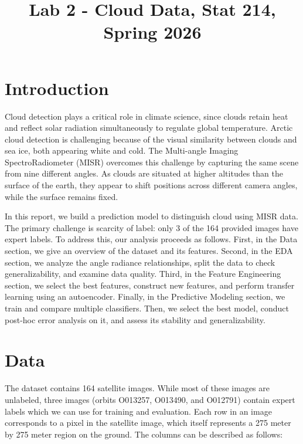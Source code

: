 \documentclass[10pt,letterpaper]{article}
\title{Lab 2 - Cloud Data, Stat 214, Spring 2026\vspace{-2em}}
\begin{document}
\maketitle

\section{Introduction}

Cloud detection plays a critical role in climate science, since clouds retain heat and reflect solar radiation simultaneously to regulate global temperature. Arctic cloud detection is challenging because of the visual similarity between clouds and sea ice, both appearing white and cold. The Multi-angle Imaging SpectroRadiometer (MISR) overcomes this challenge by capturing the same scene from nine different angles. As clouds are situated at higher altitudes than the surface of the earth, they appear to shift positions across different camera angles, while the surface remains fixed. 

In this report, we build a prediction model to distinguish cloud using MISR data. The primary challenge is scarcity of label: only 3 of the 164 provided images have expert labels. To address this, our analysis proceeds as follows. First, in the Data section, we  give an overview of the dataset and its features. Second, in the EDA section, we analyze the angle radiance relationships, split the data to check generalizability, and examine data quality. Third, in the Feature Engineering section, we select the best features, construct new features, and perform transfer learning using an autoencoder. Finally, in the Predictive Modeling section, we train and compare multiple classifiers. Then, we select the best model, conduct post-hoc error analysis on it, and assess its stability and generalizability.

\section{Data}

The dataset contains 164 satellite images. While most of these images are unlabeled, three images (orbits O013257, O013490, and O012791) contain expert labels which we can use for training and evaluation. Each row in an image corresponds to a pixel in the satellite image, which itself represents a 275 meter by 275 meter region on the ground. The columns can be described as follows:
\end{document}
